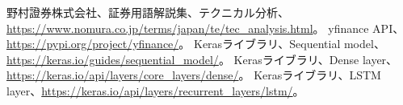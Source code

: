 \documentclass[a4paper, 11pt, titlepage]{jsarticle}
\begin{document}
\begin{thebibliography}{99}
   野村證券株式会社、証券用語解説集、テクニカル分析、\url{https://www.nomura.co.jp/terms/japan/te/tec_analysis.html}。
   yfinance API、\url{https://pypi.org/project/yfinance/}。
   Kerasライブラリ、Sequential model、\url{https://keras.io/guides/sequential_model/}。
   Kerasライブラリ、Dense layer、\url{https://keras.io/api/layers/core_layers/dense/}。
   Kerasライブラリ、LSTM layer、\url{https://keras.io/api/layers/recurrent_layers/lstm/}。
  
\end{thebibliography}
\end{document}

